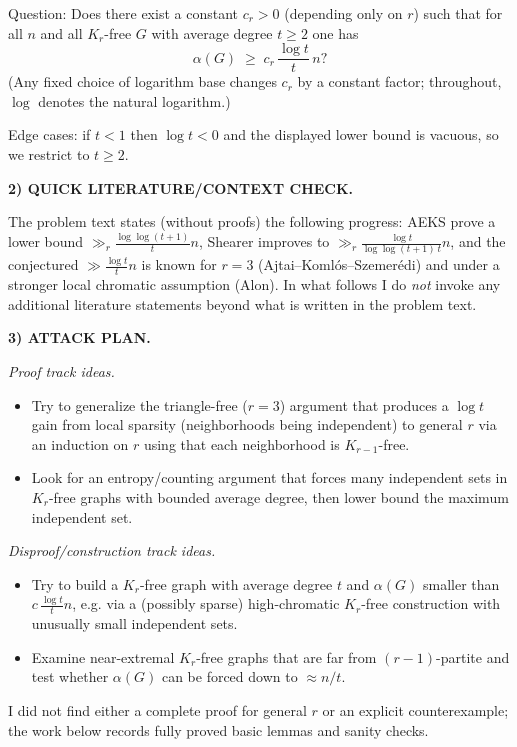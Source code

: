 Question: Does there exist a constant $c_r>0$ (depending only on $r$) such that for all $n$ and all $K_r$-free $G$ with average degree $t\ge 2$ one has
\[
\alpha(G)\;\ge\; c_r\,\frac{\log t}{t}\,n?
\]
(Any fixed choice of logarithm base changes $c_r$ by a constant factor; throughout, $\log$ denotes the natural logarithm.)

Edge cases: if $t<1$ then $\log t<0$ and the displayed lower bound is vacuous, so we restrict to $t\ge 2$.

\medskip
\noindent\textbf{2) QUICK LITERATURE/CONTEXT CHECK.}

The problem text states (without proofs) the following progress: AEKS prove a lower bound $\gg_r \frac{\log\log(t+1)}{t}n$, Shearer improves to $\gg_r \frac{\log t}{\log\log(t+1)\,t}n$, and the conjectured $\gg \frac{\log t}{t}n$ is known for $r=3$ (Ajtai--Koml\'os--Szemer\'edi) and under a stronger local chromatic assumption (Alon). In what follows I do \emph{not} invoke any additional literature statements beyond what is written in the problem text.

\medskip
\noindent\textbf{3) ATTACK PLAN.}

\emph{Proof track ideas.}
\begin{itemize}
\item Try to generalize the triangle-free ($r=3$) argument that produces a $\log t$ gain from local sparsity (neighborhoods being independent) to general $r$ via an induction on $r$ using that each neighborhood is $K_{r-1}$-free.
\item Look for an entropy/counting argument that forces many independent sets in $K_r$-free graphs with bounded average degree, then lower bound the maximum independent set.
\end{itemize}

\emph{Disproof/construction track ideas.}
\begin{itemize}
\item Try to build a $K_r$-free graph with average degree $t$ and $\alpha(G)$ smaller than $c\,\frac{\log t}{t}n$, e.g. via a (possibly sparse) high-chromatic $K_r$-free construction with unusually small independent sets.
\item Examine near-extremal $K_r$-free graphs that are far from $(r-1)$-partite and test whether $\alpha(G)$ can be forced down to $\approx n/t$.
\end{itemize}

I did not find either a complete proof for general $r$ or an explicit counterexample; the work below records fully proved basic lemmas and sanity checks.

